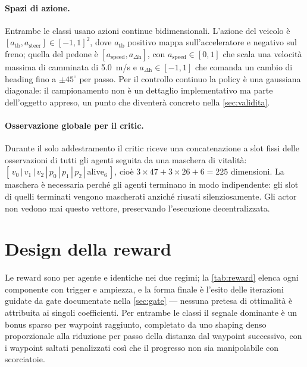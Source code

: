 \paragraph{Spazi di azione.}
Entrambe le classi usano azioni continue bidimensionali. L'azione del
veicolo è $[a_{\mathrm{tb}}, a_{\mathrm{steer}}] \in [-1,1]^2$, dove
$a_{\mathrm{tb}}$ positivo mappa sull'acceleratore e negativo sul freno;
quella del pedone è $[a_{\mathrm{speed}}, a_{\Delta\mathrm{h}}]$, con
$a_{\mathrm{speed}} \in [0,1]$ che scala una velocità massima di
camminata di \SI{5.0}{m/s} e $a_{\Delta\mathrm{h}} \in [-1,1]$ che
comanda un cambio di heading fino a $\pm 45^{\circ}$ per passo. Per il
controllo continuo la policy è una gaussiana diagonale: il campionamento
non è un dettaglio implementativo ma parte dell'oggetto appreso, un
punto che diventerà concreto nella \cref{sec:validita}.

\paragraph{Osservazione globale per il critic.}
Durante il solo addestramento il critic riceve una concatenazione a slot
fissi delle osservazioni di tutti gli agenti seguita da una maschera di
vitalità:
$[\,v_0\,|\,v_1\,|\,v_2\,|\,p_0\,|\,p_1\,|\,p_2\,|\,\text{alive}_{6}\,]$,
cioè $3 \times 47 + 3 \times 26 + 6 = 225$ dimensioni. La maschera è
necessaria perché gli agenti terminano in modo indipendente: gli slot di
quelli terminati vengono mascherati anziché riusati silenziosamente. Gli
actor non vedono mai questo vettore, preservando l'esecuzione
decentralizzata.

\section{Design della reward}
\label{sec:reward}

Le reward sono per agente e identiche nei due regimi; la
\cref{tab:reward} elenca ogni componente con trigger e ampiezza, e la
forma finale è l'esito delle iterazioni guidate da gate documentate
nella \cref{sec:gate} --- nessuna pretesa di ottimalità è attribuita ai
singoli coefficienti. Per entrambe le classi il segnale dominante è un
bonus sparso per waypoint raggiunto, completato da uno shaping denso
proporzionale alla riduzione per passo della distanza dal waypoint
successivo, con i waypoint saltati penalizzati così che il progresso non
sia manipolabile con scorciatoie.

